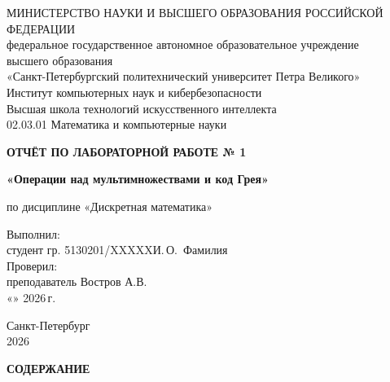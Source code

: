 \documentclass[14pt,a4paper]{extarticle}
\newcommand{\worktitle}{Операции над мультимножествами и код Грея}
\newcommand{\discipline}{Дискретная математика}
\newcommand{\studentgroup}{5130201/XXXXX}      %
\newcommand{\studentname}{И.\,О.~Фамилия}      %
\newcommand{\teachername}{Востров А.В.}
\newcommand{\reportyear}{2026}
\begin{document}
\begin{titlepage}
\thispagestyle{empty}
\singlespacing
\centering
{\normalsize МИНИСТЕРСТВО НАУКИ И ВЫСШЕГО ОБРАЗОВАНИЯ РОССИЙСКОЙ ФЕДЕРАЦИИ\\[2pt]
федеральное государственное автономное образовательное учреждение\\
высшего образования\\
«Санкт-Петербургский политехнический университет Петра Великого»\\[10pt]
Институт компьютерных наук и кибербезопасности\\
Высшая школа технологий искусственного интеллекта\\[6pt]
02.03.01 Математика и компьютерные науки\par}

\vspace{60pt}
{\bfseries\large ОТЧЁТ ПО ЛАБОРАТОРНОЙ РАБОТЕ № 1\par}
\vspace{18pt}
{\bfseries\large «\worktitle»\par}
\vspace{18pt}
{по дисциплине «\discipline»\par}

\vfill
\begin{flushleft}
\hspace{7.5cm}\begin{minipage}{9cm}
\raggedright
Выполнил:\\
студент гр. \studentgroup\hfill \studentname\\[14pt]
Проверил:\\
преподаватель \hfill \teachername\\[14pt]
«\underline{\hspace{0.8cm}}» \underline{\hspace{3cm}} \reportyear\,г.
\end{minipage}
\end{flushleft}

\vspace{40pt}
Санкт-Петербург\\\reportyear
\end{titlepage}
\setcounter{page}{2}

\clearpage
\begingroup
\linespread{1.15}\selectfont
\begin{center}\normalfont\bfseries\fontsize{14}{16}\selectfont СОДЕРЖАНИЕ\end{center}\vspace{4pt}
\makeatletter{}\makeatother
\endgroup
\end{document}
